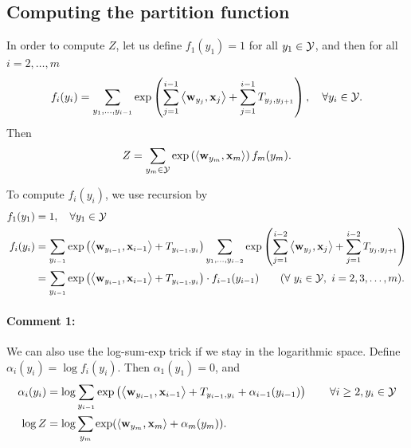 \documentclass[11pt]{report}
\begin{document}
	\subsection{Computing the partition function}
	\label{sec:partition}
	
	In order to compute $Z$, let us define $f_1(y_1) = 1$ for all $y_1 \in \mathcal{Y}$, and then for all $i = 2, \ldots, m$
	\begin{align}
		f_i(y_i) = \sum_{y_1, \ldots, y_{i-1}} \exp \left(\sum_{j=1}^{i-1} \left\langle \mathbf{\boldsymbol{w}}_{y_j},\mathbf{\boldsymbol{x}}_j \right\rangle + \sum_{j=1}^{i-1} T_{y_j, y_{j+1}}\right), \quad \forall y_i \in \mathcal{Y}.
	\end{align}
	Then
	\begin{align}
		Z = \sum_{y_m \in \mathcal{Y}} \exp \left(\left\langle \mathbf{\boldsymbol{w}}_{y_m},\mathbf{\boldsymbol{x}}_m \right\rangle\right) f_m(y_m) .
	\end{align}
	
	To compute $f_i(y_i)$, we use recursion by
	\begin{align}
		\label{eq:rec_Z_forward_1}
		f_1(y_1) &= 1, \quad \forall y_1 \in \mathcal{Y} \\
		f_i(y_i) &= \sum_{y_{i-1}} \exp \left(\left\langle \mathbf{\boldsymbol{w}}_{y_{i-1}},\mathbf{\boldsymbol{x}}_{i-1} \right\rangle + T_{y_{i-1}, y_i}\right)
		\sum_{y_1, \ldots, y_{i-2}} \exp \left(\sum_{j=1}^{i-2} \left\langle \mathbf{\boldsymbol{w}}_{y_j},\mathbf{\boldsymbol{x}}_j \right\rangle + \sum_{j=1}^{i-2} T_{y_j, y_{j+1}}\right) \\
		\label{eq:rec_Z_forward_2}
		&= \sum_{y_{i-1}} \exp \left(\left\langle \mathbf{\boldsymbol{w}}_{y_{i-1}},\mathbf{\boldsymbol{x}}_{i-1} \right\rangle + T_{y_{i-1}, y_i}\right)  \cdot f_{i-1}(y_{i-1})  \qquad (\forall\ y_i \in \mathcal{Y}, \ i = 2, 3, \ldots, m).	 
	\end{align}
	
	\paragraph{Comment 1:}
	We can also use the log-sum-exp trick if we stay in the logarithmic space. 
	Define $\alpha_i(y_i) = \log f_i(y_i)$.
	Then $\alpha_1(y_1) = 0$, and
	\begin{align}
		\alpha_i(y_i) &= \log \sum_{y_{i-1}} \exp \left(\left\langle \mathbf{\boldsymbol{w}}_{y_{i-1}},\mathbf{\boldsymbol{x}}_{i-1} \right\rangle + T_{y_{i-1}, y_i} + \alpha_{i-1}(y_{i-1})\right) \qquad \forall i \ge 2, y_i \in \mathcal{Y}\\
		\log Z &= \log \sum_{y_m} \exp (\left\langle \mathbf{\boldsymbol{w}}_{y_m},\mathbf{\boldsymbol{x}}_m \right\rangle + \alpha_m(y_m)).
	\end{align}
	
\end{document}
